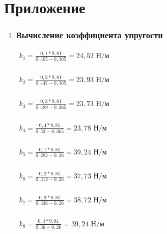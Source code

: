 \section{Приложение}
	\begin{enumerate}
		\item \subsubsection*{Вычисление коэффициента упругости}
		\label{appendix: 1}
		\begin{multicols}{2}
			\(\begin{aligned}k_1 = \frac{0,1 * 9,81}{0,405 - 0,365} = 24,52 \text{ Н/м}\end{aligned}\) \\\\
			\(\begin{aligned}k_2 = \frac{0,2 * 9,81}{0,447 - 0,365} = 23,93 \text{ Н/м}\end{aligned}\) \\\\
			\(\begin{aligned}k_3 = \frac{0,3 * 9,81}{0,489 - 0,365} = 23,73 \text{ Н/м}\end{aligned}\) \\\\
			\(\begin{aligned}k_4 = \frac{0,4 * 9,81}{0,53 - 0,365} = 23,78 \text{ Н/м}\end{aligned}\) \\\\
			\(\begin{aligned}k_5 = \frac{0,1 * 9,81}{0,285 - 0,26} = 39,24 \text{ Н/м}\end{aligned}\) \\\\
			\(\begin{aligned}k_6 = \frac{0,2 * 9,81}{0,312 - 0,26} = 37,73 \text{ Н/м}\end{aligned}\) \\\\
			\(\begin{aligned}k_7 = \frac{0,3 * 9,81}{0,336 - 0,26} = 38,72 \text{ Н/м}\end{aligned}\) \\\\
			\(\begin{aligned}k_8 = \frac{0,4 * 9,81}{0,36 - 0,26} = 39,24 \text{ Н/м}\end{aligned}\) \\\\
		\end{multicols}
		

\end{enumerate}
